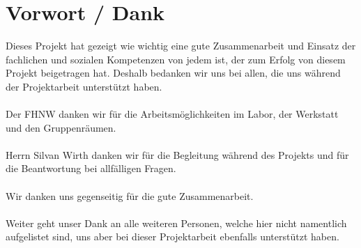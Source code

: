 \section*{Vorwort / Dank}

Dieses Projekt hat gezeigt wie wichtig eine gute Zusammenarbeit und Einsatz der fachlichen und sozialen Kompetenzen von jedem ist, der zum Erfolg von diesem Projekt beigetragen hat. Deshalb bedanken wir uns bei allen, die uns während der Projektarbeit unterstützt haben.\\
\\
Der FHNW danken wir für die Arbeitsmöglichkeiten im Labor, der Werkstatt und den Gruppenräumen.\\
\\
Herrn Silvan Wirth danken wir für die Begleitung während des Projekts und für die Beantwortung bei allfälligen Fragen.\\
\\
Wir danken uns gegenseitig für die gute Zusammenarbeit.\\
\\
Weiter geht unser Dank an alle weiteren Personen, welche hier nicht namentlich aufgelistet sind, uns aber bei dieser Projektarbeit ebenfalls unterstützt haben.
